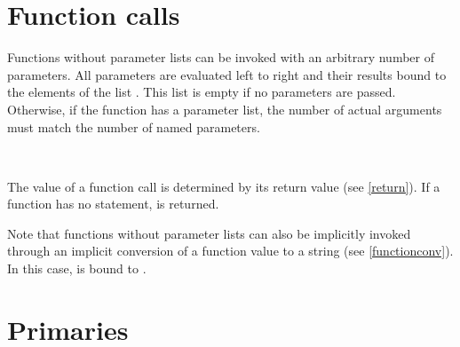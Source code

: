 \section{Function calls}\label{call}

Functions without parameter lists can be invoked with an
arbitrary number of parameters.
All parameters are evaluated left to right and their results
bound to the elements of the list . This list is
empty if no parameters are passed. Otherwise, if the function
has a parameter list, the number of actual arguments must
match the number of named parameters.

\begin{grammar}
      \produces {} \lextoken{(} \lextoken{)} \\
      \produces {}
         \lextoken{(}  \lextoken{)}
\end{grammar}

\noindent
The value of a function call is determined by its return value
(see \ref{return}). If a function has no 
statement,  is returned.

Note that functions without parameter lists can also be implicitly
invoked through an implicit conversion of a function value to a string
(see \ref{functionconv}). In this case,  is bound to
.

\section{Primaries}

\begin{grammar}
      \produces {} \\
      \produces {}  \\
      \produces {}
         \lextoken{(}  \lextoken{)} \\
      \produces {} \\
      \produces {} \\
      \produces {} \\
      \produces {} \\
      \produces \lextoken{(}  \lextoken{)} \\
      \produces {} \\
      \produces {} \\
      \produces {} \\
      \produces {} \\
      \produces {} \\
      \produces {} \\
      \produces {}
\end{grammar}

